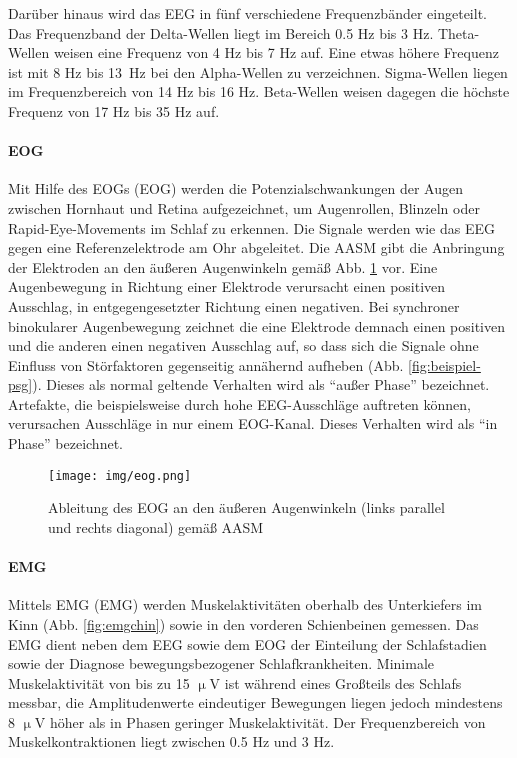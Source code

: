 Darüber hinaus wird das \acs{EEG} in fünf verschiedene Frequenzbänder eingeteilt. Das Frequenzband der Delta-Wellen liegt im Bereich 0.5 Hz bis 3 Hz. Theta-Wellen weisen eine Frequenz von 4 Hz bis 7 Hz auf. Eine etwas höhere Frequenz ist mit 8 Hz bis 13~Hz bei den Alpha-Wellen zu verzeichnen. Sigma-Wellen liegen im Frequenzbereich von 14 Hz bis 16 Hz. Beta-Wellen weisen dagegen die höchste Frequenz von 17 Hz bis 35 Hz auf. \parencite{lee-chiong_sleep_2008, steinberg_schlafmedizin_2010}\\

\paragraph{\acs{EOG}}
Mit Hilfe des \acl{EOG}s (\acs{EOG}) werden die Potenzialschwankungen der Augen zwischen Hornhaut und Retina aufgezeichnet, um Augenrollen, Blinzeln oder Rapid-Eye-Movements im Schlaf zu erkennen. Die Signale werden wie das \acs{EEG} gegen eine Referenzelektrode am Ohr abgeleitet. Die \acs{AASM} gibt die Anbringung der Elektroden an den äußeren Augenwinkeln gemäß Abb. \ref{fig:eog} vor. Eine Augenbewegung in Richtung einer Elektrode verursacht einen positiven Ausschlag, in entgegengesetzter Richtung einen negativen. Bei synchroner binokularer Augenbewegung zeichnet die eine Elektrode demnach einen positiven und die anderen einen negativen Ausschlag auf, so dass sich die Signale ohne Einfluss von Störfaktoren gegenseitig annähernd aufheben (Abb. \ref{fig:beispiel-psg}). Dieses als normal geltende Verhalten wird als "`außer Phase"' bezeichnet. Artefakte, die beispielsweise durch hohe \acs{EEG}-Ausschläge auftreten können, verursachen Ausschläge in nur einem \acs{EOG}-Kanal. Dieses Verhalten wird als "`in Phase"' bezeichnet. \parencite{iber_aasm_2007, lee-chiong_sleep_2008}

\begin{figure}[H]
	\centering
	\texttt{[image: img/eog.png]}
	\caption[Elektrodenpositionen des \acs{EOG}]{Ableitung des \acs{EOG} an den äußeren Augenwinkeln (links parallel und rechts diagonal) gemäß \acs{AASM} \parencite{iber_aasm_2007}}
	\label{fig:eog}
\end{figure}

\paragraph{\acs{EMG}}
Mittels \acl{EMG} (\acs{EMG}) werden Muskelaktivitäten oberhalb des Unterkiefers im Kinn (Abb. \ref{fig:emgchin}) sowie in den vorderen Schienbeinen gemessen. Das \acs{EMG} dient neben dem \acs{EEG} sowie dem \acs{EOG} der Einteilung der Schlafstadien sowie der Diagnose bewegungsbezogener Schlafkrankheiten. Minimale Muskelaktivität von bis zu 15 $\upmu$V ist während eines Großteils des Schlafs messbar, die Amplitudenwerte eindeutiger Bewegungen liegen jedoch mindestens 8 $\upmu$V höher als in Phasen geringer Muskelaktivität. Der Frequenzbereich von Muskelkontraktionen liegt zwischen 0.5 Hz und 3 Hz. \parencite{iber_aasm_2007, leroux_handbuch_2009, lee-chiong_sleep_2008}

